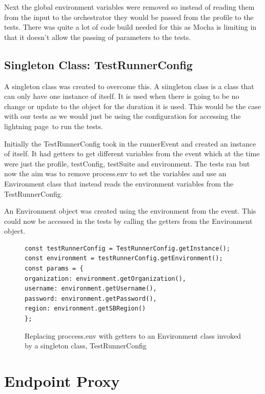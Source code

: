 \documentclass[12pt,a4paper,titlepage]{report}
\begin{document}
Next the global environment variables were removed so instead of reading them from the input to the orchestrator they would 
be passed from the profile to the tests. There was quite a lot of code build needed for this as Mocha is limiting in that it doesn't 
allow the passing of parameters to the tests. 

\subsection{Singleton Class: TestRunnerConfig}
A singleton class was created to overcome this. A siingleton class is a class that can only have one instance of 
itself. It is used when there is going to be no change or update to the object for the duration it is used. This would be the case with our tests as we would just be using the configuration for accessing the lightning page to run the tests.

Initially the TestRunnerConfig took in the runnerEvent and created an instance of itself. It had getters to get different variables from the event which at the time were just the profile, testConfig, testSuite and environment. The tests ran but now the aim was to remove process.env to set the variables and use an Environment class that instead reads the environment variables from the TestRunnerConfig.

An Environment object was created using the environment from the event. This could now be accessed in the tests by calling the getters from the Environment object.
\begin{figure}[H]
  \begin{tcolorbox}
    \begin{verbatim}
const testRunnerConfig = TestRunnerConfig.getInstance();
const environment = testRunnerConfig.getEnvironment();
const params = {
organization: environment.getOrganization(),
username: environment.getUsername(),
password: environment.getPassword(),
region: environment.getSBRegion()
};
\end{verbatim}
  \end{tcolorbox}
  \caption{Replacing proccess.env with getters to an Environment class invoked by a singleton class, TestRunnerConfig}
\end{figure}

\section{Endpoint Proxy}
\end{document}
